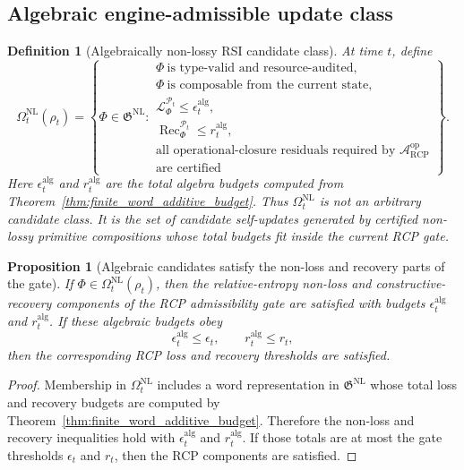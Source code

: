\documentclass[11pt]{article}
\newtheorem{proposition}[theorem]{Proposition}
\newtheorem{definition}[theorem]{Definition}
\newcommand{\Acal}{\mathcal{A}}
\newcommand{\Pcal}{\mathcal{P}}
\newcommand{\Lcal}{\mathcal{L}}
\newcommand{\1}{\mathbf{1}}
\newcommand{\RCP}{\mathrm{RCP}}
\providecommand{\Rec}{\operatorname{Rec}}
\begin{document}
\subsection{Algebraic engine-admissible update class}

\begin{definition}[Algebraically non-lossy RSI candidate class]
\label{def:algebraically_nl_rsi_candidate_class}
At time \(t\), define
\[
\Omega_t^{\mathrm{NL}}(\rho_t)
=
\left\{
\Phi\in\mathfrak G^{\mathrm{NL}}:
\begin{array}{l}
\Phi\ \text{is type-valid and resource-audited},\\
\Phi\ \text{is composable from the current state},\\
\Lcal_{\Phi}^{\Pcal_t}\le\epsilon_t^{\mathrm{alg}},\\
\Rec_{\Phi}^{\Pcal_t}\le r_t^{\mathrm{alg}},\\
\text{all operational-closure residuals required by }\Acal_{\RCP}^{\mathrm{op}}\\
\text{are certified}
\end{array}
\right\}.
\]
Here \(\epsilon_t^{\mathrm{alg}}\) and \(r_t^{\mathrm{alg}}\) are the total algebra budgets computed from Theorem~\ref{thm:finite_word_additive_budget}.  Thus \(\Omega_t^{\mathrm{NL}}\) is not an arbitrary candidate class.  It is the set of candidate self-updates generated by certified non-lossy primitive compositions whose total budgets fit inside the current RCP gate.
\end{definition}

\begin{proposition}[Algebraic candidates satisfy the non-loss and recovery parts of the gate]
\label{prop:algebraic_candidates_satisfy_nonloss_recovery_gate}
If \(\Phi\in\Omega_t^{\mathrm{NL}}(\rho_t)\), then the relative-entropy non-loss and constructive-recovery components of the RCP admissibility gate are satisfied with budgets \(\epsilon_t^{\mathrm{alg}}\) and \(r_t^{\mathrm{alg}}\).  If these algebraic budgets obey
\[
\epsilon_t^{\mathrm{alg}}\le \epsilon_t,
\qquad
r_t^{\mathrm{alg}}\le r_t,
\]
then the corresponding RCP loss and recovery thresholds are satisfied.
\end{proposition}

\begin{proof}
Membership in \(\Omega_t^{\mathrm{NL}}\) includes a word representation in \(\mathfrak G^{\mathrm{NL}}\) whose total loss and recovery budgets are computed by Theorem~\ref{thm:finite_word_additive_budget}.  Therefore the non-loss and recovery inequalities hold with \(\epsilon_t^{\mathrm{alg}}\) and \(r_t^{\mathrm{alg}}\).  If those totals are at most the gate thresholds \(\epsilon_t\) and \(r_t\), then the RCP components are satisfied.
\end{proof}
\end{document}
